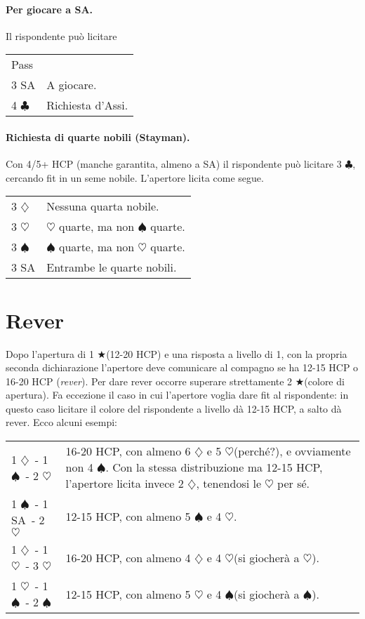 \documentclass[a4paper,10pt]{article}
\renewcommand{\c}{$\clubsuit$\xspace}
\renewcommand{\d}{$\diamondsuit$\xspace}
\newcommand{\h}{$\heartsuit$\xspace}
\newcommand{\s}{$\spadesuit$\xspace}
\renewcommand{\j}{$\bigstar$\xspace}
\newcommand{\sa}{SA\xspace}
\newcommand{\smallspace}{\vskip0.3cm}
\newenvironment{twocol}
  {\smallspace\noindent\begin{tabular}{l p{0.78\textwidth}}}
  {\end{tabular}\smallspace}
\begin{document}
\paragraph{Per giocare a \sa.} Il rispondente può licitare

\begin{twocol}
	Pass & \\
	3 \sa & A giocare.\\
	4 \c & Richiesta d'Assi.
\end{twocol}

\paragraph{Richiesta di quarte nobili (Stayman).} Con 4/5+ HCP (manche garantita, almeno a \sa) il rispondente può licitare 3 \c, cercando fit in un seme nobile. L'apertore licita come segue.

\begin{twocol}
 3 \d & Nessuna quarta nobile.\\
 3 \h & \h quarte, ma non \s quarte.\\
 3 \s & \s quarte, ma non \h quarte.\\
 3 SA & Entrambe le quarte nobili.
\end{twocol}


\section{Rever}

Dopo l'apertura di 1 \j (12-20 HCP) e una risposta a livello di 1, con la propria seconda dichiarazione l'apertore deve comunicare al compagno se ha 12-15 HCP o 16-20 HCP (\emph{rever}). Per dare rever occorre superare strettamente 2 \j (colore di apertura). Fa eccezione il caso in cui l'apertore voglia dare fit al rispondente: in questo caso licitare il colore del rispondente a livello dà 12-15 HCP, a salto dà rever. Ecco alcuni esempi:

\begin{twocol}
1 \d\ - 1 \s\ - 2 \h & 16-20 HCP, con almeno 6 \d e 5 \h (perché?), e ovviamente non 4 \s. Con la stessa distribuzione ma 12-15 HCP, l'apertore licita invece 2 \d, tenendosi le \h per sé.\\
1 \s\ - 1 \sa\ - 2 \h & 12-15 HCP, con almeno 5 \s e 4 \h.\\
1 \d\ - 1 \h\ - 3 \h & 16-20 HCP, con almeno 4 \d e 4 \h (si giocherà a \h).\\
1 \h\ - 1 \s\ - 2 \s & 12-15 HCP, con almeno 5 \h e 4 \s (si giocherà a \s).
\end{twocol}
\end{document}
